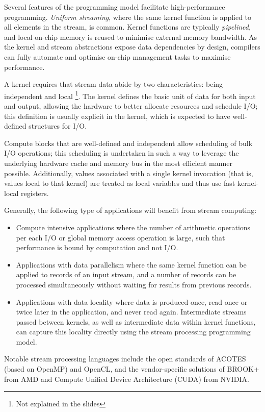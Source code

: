 Several features of the programming model facilitate high-performance programming. \textit{Uniform streaming}, where the same kernel function is applied to all elements in the stream, is common. Kernel functions are typically \textit{pipelined}, and local on-chip memory is reused to minimise external memory bandwidth. As the kernel and stream abstractions expose data dependencies by design, compilers can fully automate and optimise on-chip management tasks to maximise performance.

A kernel requires that stream data abide by two characteristics: being independent and local \footnote{Not explained in the slides}. The kernel defines the basic unit of data for both input and output, allowing the hardware to better allocate resources and schedule I/O; this definition is usually explicit in the kernel, which is expected to have well-defined structures for I/O.

Compute blocks that are well-defined and independent allow scheduling of bulk I/O operations; this scheduling is undertaken in such a way to leverage the underlying hardware cache and memory bus in the most efficient manner possible. Additionally, values associated with a single kernel invocation (that is, values local to that kernel) are treated as local variables and thus use fast kernel-local registers.

Generally, the following type of applications will benefit from stream computing: \begin{itemize}
\item Compute intensive applications where the number of arithmetic operations per each I/O or global memory access operation is large, such that performance is bound by computation and not I/O. 
\item Applications with data parallelism where the same kernel function can be applied to records of an input stream, and a number of records can be processed simultaneously without waiting for results from previous records.
\item Applications with data locality where data is produced once, read once or twice later in the application, and never read again. Intermediate streams passed between kernels, as well as intermediate data within kernel functions, can capture this locality directly using the stream processing programming model.  
\end{itemize}

Notable stream processing languages include the open standards of ACOTES (based on OpenMP) and OpenCL, and the vendor-specific solutions of BROOK+ from AMD and Compute Unified Device Architecture (CUDA) from NVIDIA.

